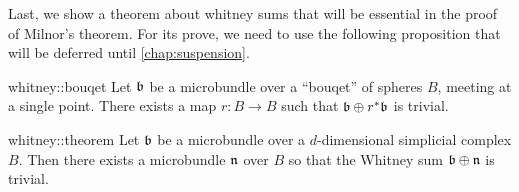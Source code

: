 \begin{myparagraph}
    Last, we show a theorem about whitney sums that will be essential in the proof of Milnor's theorem.
    For its prove, we need to use the following proposition that will be deferred until \autoref{chap:suspension}.
\end{myparagraph}

\begin{myproposition}{whitney::bouqet}
    Let $\mathfrak{b}$ be a microbundle over a ``bouqet'' of spheres $B$, meeting at a single point.
    There exists a map $r: B \to B$ such that $\mathfrak{b} \oplus r^*\mathfrak{b}$ is trivial.
\end{myproposition}

\begin{mytheorem}{whitney::theorem}
    Let $\mathfrak{b}$ be a microbundle over a $d$-dimensional simplicial complex $B$.
    Then there exists a microbundle $\mathfrak{n}$ over $B$ so that the Whitney sum $\mathfrak{b} \oplus \mathfrak{n}$ is trivial.
\end{mytheorem}
